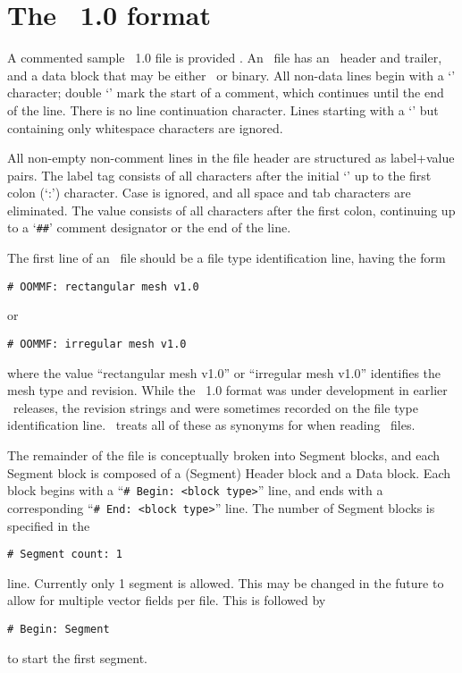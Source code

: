 \setcounter{secnumdepth}{\value{ffoldsecnumdepth}}

\section{The \OVF\ 1.0 format}\label{sec:ovfformat}
A commented sample \OVF\ 1.0 file is provided
.
An \OVF\ file has an \ASCII\ header and trailer, and a data block that
may be either \ASCII\ or binary.  All non-data lines begin with a `\lb'
character; double `\lb\lb' mark the start of a comment, which
continues until the end of the line.  There is no line continuation
character.  Lines starting with a `\lb' but containing only whitespace
characters are ignored.

All non-empty non-comment lines in the file header are structured as
label+value pairs.  The label tag consists of all characters after the
initial `\lb' up to the first colon (`:') character.  Case is ignored,
and all space and tab characters are eliminated.  The value consists
of all characters after the first colon, continuing up to a `\verb+##+'
comment designator or the end of the line.

The first line of an \OVF\ file should be a file type identification
line, having the form
\begin{verbatim}
# OOMMF: rectangular mesh v1.0
\end{verbatim}
or
\begin{verbatim}
# OOMMF: irregular mesh v1.0
\end{verbatim}
where the value ``rectangular mesh v1.0'' or ``irregular mesh v1.0''
identifies the mesh type and revision.  While the \OVF\ 1.0 format was
under development in earlier \OOMMF\ releases, the revision strings
 and  were sometimes recorded on the file type
identification line. \OOMMF\ treats all of these as synonyms for
 when reading \OVF\ files.

The remainder of the file is conceptually broken into Segment
blocks, and each Segment block is composed of a
(Segment) Header block and a Data block.  Each block begins with a
``\verb+# Begin: <block type>+'' line, and ends with a corresponding
``\verb+# End: <block type>+'' line.  The number of Segment blocks is
specified in the
\begin{verbatim}
# Segment count: 1
\end{verbatim}
line.  Currently only 1 segment is allowed.  This may be changed in
the future to allow for multiple vector fields per file.
This is followed by
\begin{verbatim}
# Begin: Segment
\end{verbatim}
to start the first segment.

